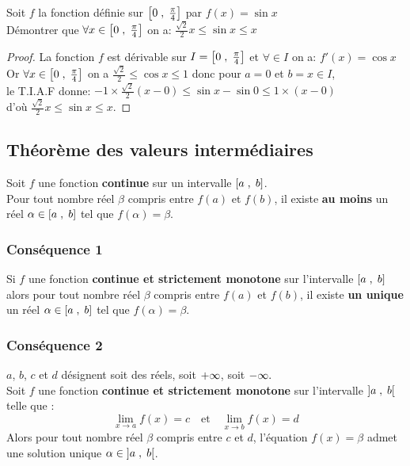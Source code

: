 \begin{exercice}
 Soit $ f $ la fonction définie sur $ \left[0\;,\; \frac{\pi}{4}\right] $ par $ f(x)= \sin x $\\
 Démontrer que $ \forall x \in \left[0\;,\; \frac{\pi}{4}\right] $ on a: $ \frac{\sqrt{2}}{2}x \leq \sin x \leq x $\\
\end{exercice}
\begin{proof}
 La fonction $ f $ est dérivable sur $ I=\left[0\;,\; \frac{\pi}{4}\right] $  et $ \forall \in I $ on a: $ f'(x)=\cos x $ \\ Or $ \forall x \in \left[0\;,\; \frac{\pi}{4}\right] $ on a $ \frac{\sqrt{2}}{2} \leq \cos x \leq 1 $ donc pour $ a=0 $ et $ b=x\in I $,\\ le T.I.A.F donne: $-1\times \frac{\sqrt{2}}{2}(x-0) \leq \sin x -\sin 0 \leq 1\times (x-0) $\\ d'où   $ \frac{\sqrt{2}}{2}x \leq \sin x \leq x $.
 \end{proof}
 \subsection{ Théorème des valeurs intermédiaires}
 \begin{theorem}[T.V.I]
 Soit $ f $ une fonction \textbf{\color{magenta}continue} sur un intervalle $ \left[a\;,\; b\right] $. \\
 Pour tout nombre réel $ \beta $ compris entre $f(a) $ et $f(b) $, il existe \textbf{\color{magenta} au moins} un réel $ \alpha \in \left[a\;,\; b\right] $ tel que $ f(\alpha)= \beta. $
 \end{theorem}
 
 \subsubsection*{Conséquence 1}
  Si $ f $ une fonction \textbf{\color{magenta}continue et strictement monotone} sur  l'intervalle $ \left[a\;,\; b\right] $ alors pour tout nombre réel $ \beta $ compris entre $f(a) $ et $f(b) $, il existe  \textbf{\color{magenta}un unique} un réel $ \alpha \in \left[a\;,\; b\right] $ tel que $ f(\alpha)= \beta. $
 \subsubsection*{Conséquence 2}
 $ a$, $b$,  $c $  et $ d$ désignent soit des réels, soit $ +\infty $, soit $ -\infty. $\\
  Soit $ f $ une fonction \textbf{\color{magenta}continue et strictement monotone} sur  l'intervalle $ \left]a \;,\; b\right[ $ telle que :
   \[\displaystyle \lim_{x \to a}f(x)=c \quad \textrm{et}\quad \displaystyle\lim_{x \to b}f(x)=d\]
Alors pour tout nombre réel $ \beta $ compris entre $c $ et $d $, l'équation $ f(x)=\beta $ admet une solution  unique $ \alpha \in \left]a \;,\; b\right[ $.\\

